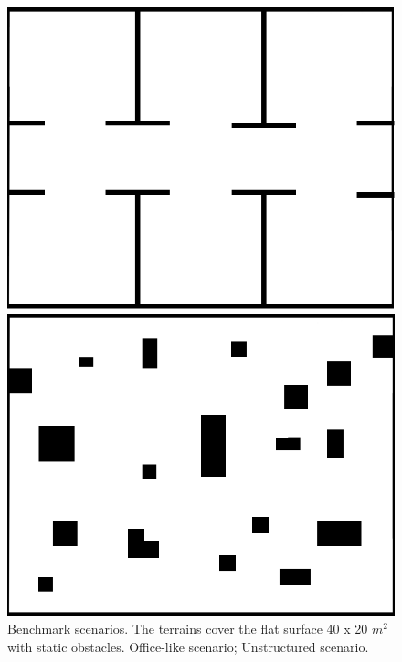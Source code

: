 \documentclass[letterpaper, 10 pt, conference]{ieeeconf}  %
\begin{document}
\begin{figure}[t]
	\centering
	\begin{minipage}{\dimexpr.48\columnwidth}
		\centering
		\includegraphics[width=\columnwidth]{office1.png}
		\captionsetup{labelformat=empty}
		\caption*{}
		\label{fig:office}
	\end{minipage}%
	\hspace{0.1cm}%
	\begin{minipage}{\dimexpr.48\columnwidth}
		\centering
		\includegraphics[width=\columnwidth]{unstructured.png}
		\captionsetup{labelformat=empty}
		\caption*{}
		\label{fig:unstructured}
	\end{minipage}
 \caption{Benchmark scenarios. The terrains cover the flat surface 40 x 20 $m^{2}$ with static obstacles.  Office-like scenario;  Unstructured scenario. }
 \label{fig:scenarios}
\end{figure}
\end{document}
